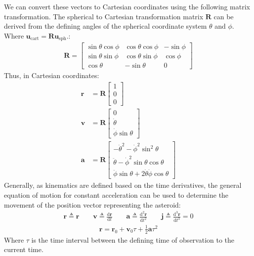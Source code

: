 \documentclass[letterpaper,11pt,english]{sphinxmanual}
\begin{document}
\sphinxAtStartPar
We can convert these vectors to Cartesian coordinates using the following
matrix transformation. The spherical to Cartesian transformation matrix
\(\mathbf{R}\) can be derived from the defining angles of the spherical
coordinate system \(\theta\) and \(\phi\). Where
\(\mathbf{u}_\text{cart} = \mathbf{R} \mathbf{u}_\text{sph}\).:
\begin{equation*}
\begin{split}\mathbf{R} = \begin{bmatrix}
\sin\theta\cos\phi & \cos\theta\cos\phi & -\sin\phi \\
\sin\theta\sin\phi & \cos\theta\sin\phi &  \cos\phi \\
\cos\theta         & -\sin\theta        & 0
\end{bmatrix}\end{split}
\end{equation*}
\sphinxAtStartPar
Thus, in Cartesian coordinates:
\begin{equation*}
\begin{split}\mathbf{r} &= \mathbf{R} \begin{bmatrix} 1 \\ 0 \\ 0 \end{bmatrix} \\
\mathbf{v} &= \mathbf{R} \begin{bmatrix} 0 \\ \dot\theta \\ \dot\phi \sin\theta \end{bmatrix} \\
\mathbf{a} &= \mathbf{R} \begin{bmatrix} -\dot\theta^2 - \dot\phi^2\sin^2\theta \\ \ddot\theta - \dot\phi^2\sin\theta\cos\theta \\ \ddot\phi\sin\theta  + 2 \dot\theta\dot\phi\cos\theta \end{bmatrix}\end{split}
\end{equation*}
\sphinxAtStartPar
Generally, as kinematics are defined based on the time derivatives, the general
equation of motion for constant acceleration can be used to determine the
movement of the position vector representing the asteroid:
\begin{equation*}
\begin{split}\mathbf{r} \triangleq \mathbf{r} \qquad \mathbf{v} \triangleq \frac{\mathrm{d}\mathbf{r}}{\mathrm{d}t} \qquad \mathbf{a} \triangleq \frac{\mathrm{d}^2\mathbf{r}}{\mathrm{d}t^2} \qquad \mathbf{j} \triangleq \frac{\mathrm{d}^3\mathbf{r}}{\mathrm{d}t^3} = 0\end{split}
\end{equation*}\begin{equation*}
\begin{split}\mathbf{r} = \mathbf{r}_0 + \mathbf{v}_0 \tau + \frac{1}{2} \mathbf{a} \tau^2\end{split}
\end{equation*}
\sphinxAtStartPar
Where \(\tau\) is the time interval between the defining time of
observation to the current time.
\end{document}
